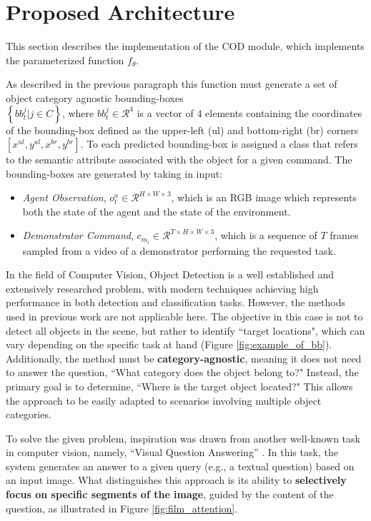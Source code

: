 \section{Proposed Architecture}
\label{sec:cod_architecture}
This section describes the implementation of the COD module, which implements the parameterized function $f_{\theta}$. 

As described in the previous paragraph this function must generate a set of object category agnostic bounding-boxes \\ $\left\{ bb^{j}_{t} | j \in C \right\}$, where $ bb^{j}_{t}\in \mathcal{R}^{4}$ is a vector of 4 elements containing the coordinates of the bounding-box defined as the upper-left (ul) and bottom-right (br) corners $\left[x^{ul}, y^{ul}, x^{br}, y^{br}\right]$. To each predicted bounding-box is assigned a class that refers to the semantic attribute associated with the object for a given command. 
The bounding-boxes are generated by taking in input:
\begin{itemize}
    \item \textit{Agent Observation},  $o^{a}_{t} \in \mathcal{R}^{H \times W \times 3}$, which is an RGB image which represents both the state of the agent and the state of the environment.
    \item \textit{Demonstrator Command}, $c_{m_{i}} \in \mathcal{R}^{T \times H \times W \times 3}$, which is a sequence of $T$ frames sampled from a video of a demonstrator performing the requested task.
\end{itemize}

In the field of Computer Vision, Object Detection is a well established and extensively researched problem, with modern techniques achieving high performance in both detection and classification tasks. However, the methods used in previous work \cite{jiang2023vima, zhu2023viola} are not applicable here. The objective in this case is not to detect all objects in the scene, but rather to identify ``target locations", which can vary depending on the specific task at hand (Figure \ref{fig:example_of_bb}). Additionally, the method must be \textbf{category-agnostic}, meaning it does not need to answer the question, ``What category does the object belong to?" Instead, the primary goal is to determine, ``Where is the target object located?" This allows the approach to be easily adapted to scenarios involving multiple object categories.


To solve the given problem, inspiration was drawn from another well-known task in computer vision, namely, ``Visual Question Answering'' \cite{perez2018film}. In this task, the system generates an answer to a given query (e.g., a textual question) based on an input image. What distinguishes this approach is its ability to \textbf{selectively focus on specific segments of the image}, guided by the content of the question, as illustrated in Figure \ref{fig:film_attention}.


